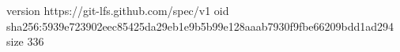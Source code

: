 version https://git-lfs.github.com/spec/v1
oid sha256:5939e723902eec85425da29eb1e9b5b99e128aaab7930f9fbe66209bdd1ad294
size 336
